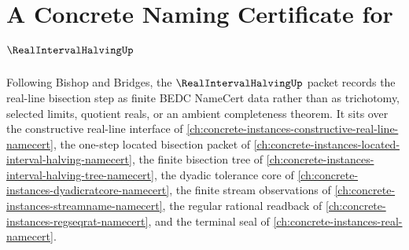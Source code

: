 \chapter{A Concrete Naming Certificate for $\RealIntervalHalvingUp$}
\label{ch:concrete-instances-real-interval-halving-namecert}

Following Bishop and Bridges, the $\RealIntervalHalvingUp$ packet records the real-line bisection step as finite BEDC NameCert data rather than as trichotomy, selected limits, quotient reals, or an ambient completeness theorem. It sits over the constructive real-line interface of \autoref{ch:concrete-instances-constructive-real-line-namecert}, the one-step located bisection packet of \autoref{ch:concrete-instances-located-interval-halving-namecert}, the finite bisection tree of \autoref{ch:concrete-instances-interval-halving-tree-namecert}, the dyadic tolerance core of \autoref{ch:concrete-instances-dyadicratcore-namecert}, the finite stream observations of \autoref{ch:concrete-instances-streamname-namecert}, the regular rational readback of \autoref{ch:concrete-instances-regseqrat-namecert}, and the terminal seal of \autoref{ch:concrete-instances-real-namecert}.


